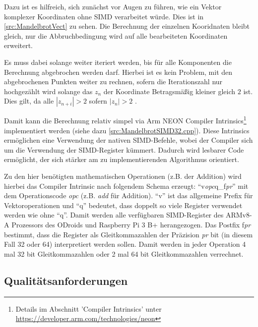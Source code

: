 Dazu ist es hilfreich, sich zunächst vor Augen zu führen, wie ein Vektor komplexer Koordinaten ohne SIMD verarbeitet würde.
Dies ist in \autoref{src:MandelbrotVect} zu sehen.
Die Berechnung der einzelnen Kooridnaten bleibt gleich, nur die Abbruchbedingung wird auf alle bearbeiteten Koordinaten erweitert.

Es muss dabei solange weiter iteriert werden, bis für alle Komponenten die Berechnung abgebrochen werden darf.
Hierbei ist es kein Problem, mit den abgebrochenen Punkten weiter zu rechnen, sofern die
Iterationszahl nur hochgezählt wird solange das $z_n$ der Koordinate Betragsmäßig kleiner gleich $2$ ist.
Dies gilt, da alle $|z_{n+i}| > 2$ sofern $|z_n| > 2$ \cite{424331}.

\begin{figure}[h!]
	
\end{figure}

Damit kann die Berechnung relativ simpel via Arm NEON Compiler Intrinsics\footnote{Details im Abschnitt 'Compiler Intrinsics' unter \url{https://developer.arm.com/technologies/neon}} implementiert werden (siehe dazu \autoref{src:MandelbrotSIMD32.cpp}).
Diese Intrinsics ermöglichen eine Verwendung der nativen SIMD-Befehle, wobei der Compiler sich um die Verwendung der SIMD-Register kümmert.
Dadurch wird lesbarer Code ermöglicht, der sich stärker am zu implementierenden Algorithmus orientiert.

Zu den hier benötigten mathematischen Operationen (z.B. der Addition) wird hierbei das Compiler Intrinsic nach folgendem Schema erzeugt:
\enquote{v\textit{opc}q\_f\textit{pr}} mit dem Operationscode \textit{opc} (z.B. \textit{add} für Addition).
\enquote{v} ist das allgemeine Prefix für Vektoroperationen und \enquote{q} bedeutet, dass doppelt so viele Register verwendet werden wie ohne \enquote{q}.
Damit werden alle verfügbaren SIMD-Register des ARMv8-A Prozessors des ODroids und Raspberry Pi 3 B+ herangezogen.
Das Postfix f\textit{pr} bestimmt, dass die Register als Gleitkommazahlen der Präzision \textit{pr} bit (in diesem Fall 32 oder 64) interpretiert werden sollen.
Damit werden in jeder Operation 4 mal 32 bit Gleitkommazahlen oder 2 mal 64 bit Gleitkommazahlen verrechnet.

\subsection{Qualitätsanforderungen}

